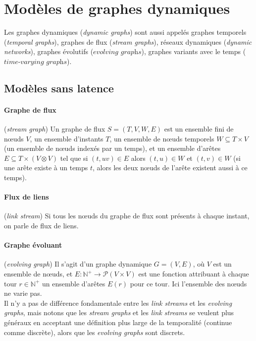\documentclass[12pt,a4paper]{article}
\begin{document}
\section{Modèles de graphes dynamiques}

Les graphes dynamiques (\textit{dynamic graphs}) sont aussi appelés
graphes temporels (\textit{temporal graphs}), graphes de flux
(\textit{stream graphs}), réseaux dynamiques (\textit{dynamic
  networks}), graphes évolutifs (\(\textit{evolving graphs}\)),
graphes variants avec le temps (\(\textit{time-varying graphs}\)).

\subsection{Modèles sans latence}

\paragraph{Graphe de flux}\cite{latapy2017stream} (\textit{stream
  graph}) Un graphe de flux \(S = (T, V, W, E)\) est un ensemble fini
de nœuds \(V\), un ensemble d'instants \(T\), un ensemble de nœuds
temporels \(W \subseteq T \times V\) (un ensemble de nœuds indexés par
un temps), et un ensemble d'arêtes
\(E \subseteq T \times (V \otimes V)\) tel que si \((t, uv) \in E\)
alors \((t, u) \in W\) et \((t, v) \in W\) (si une arête existe à un
temps \(t\), alors les deux nœuds de l'arête existent aussi à ce
temps).

\paragraph{Flux de liens}\cite{latapy2017stream} (\textit{link
stream}) Si tous les nœuds du graphe de flux sont présents à chaque
instant, on parle de flux de liens.

\paragraph{Graphe évoluant}\cite{kuhn2011dynamic} (\textit{evolving
  graph}) Il s'agit d'un graphe dynamique \(G = (V, E)\), où \(V\) est
un ensemble de nœuds, et
\(E : \mathbb{N}^{+} \to \mathcal{P}(V \times V)\) est une fonction
attribuant à chaque tour \(r \in \mathbb{N}^{+}\) un ensemble d'arêtes
\(E(r)\) pour ce tour. Ici l'ensemble des nœuds ne varie pas.\\


Il n'y a pas de différence fondamentale entre les \textit{link
  streams} et les \textit{evolving graphs}, mais notons que les
\textit{stream graphs} et les \textit{link streams} se veulent plus
généraux en acceptant une définition plus large de la temporalité
(continue comme discrète), alors que les \textit{evolving graphs} sont
discrets.
\end{document}
